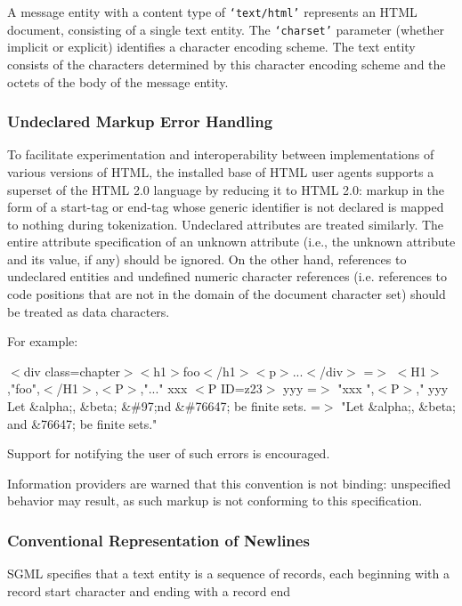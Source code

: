 A message entity with a content type of {\tt `text/html'} represents
an HTML document, consisting of a single text entity.  The
{\tt `charset'} parameter (whether implicit or explicit) identifies a
character encoding scheme.  The text entity consists of the characters
determined by this character encoding scheme and the octets of the body of
the message entity.
\par \subsubsection*{Undeclared Markup Error Handling}\par 
To facilitate experimentation and interoperability between
implementations of various versions of HTML, the installed base of
HTML user agents supports a superset of the HTML 2.0 language by
reducing it to HTML 2.0:  markup in the form of a start-tag or end-tag
whose generic identifier is not declared is mapped to nothing during
tokenization.  Undeclared attributes are treated similarly.  The entire
attribute specification of an unknown attribute (i.e., the unknown
attribute and its value, if any) should be ignored.  On the other
hand, references to undeclared entities and undefined numeric
character references (i.e.  references to code positions that are not
in the domain of the document character set) should be treated as data
characters.
\par \par 
For example:
\par $<$div class=chapter$>$$<$h1$>$foo$<$/h1$>$$<$p$>$...$<$/div$>$
  =$>$ $<$H1$>$,"foo",$<$/H1$>$,$<$P$>$,"..."
xxx $<$P ID=z23$>$ yyy
  =$>$ "xxx ",$<$P$>$," yyy
Let \&alpha;, \&beta; \&\#97;nd \&\#76647; be finite sets.
  =$>$ "Let \&alpha;, \&beta; and \&76647; be finite sets."
\par 
Support for notifying the user of such errors is encouraged.
\par \par 
Information providers are warned that this convention is not binding:
unspecified behavior may result, as such markup is not conforming to
this specification.
\par \subsubsection*{Conventional Representation of Newlines}\par 
SGML specifies that a text entity is a sequence of records, each
beginning with a record start character and ending with a record end
